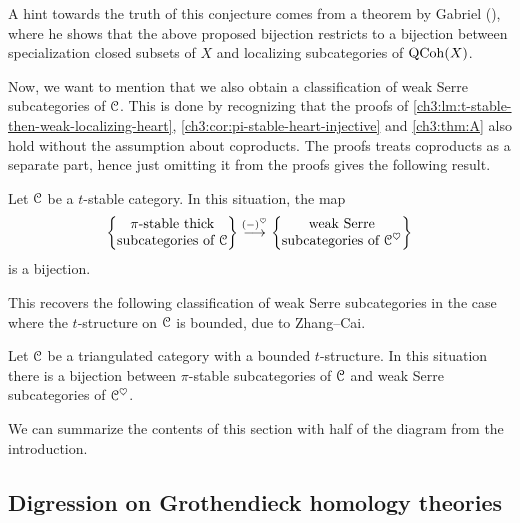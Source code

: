\begin{remark}
    A hint towards the truth of this conjecture comes from a theorem by Gabriel (\cite[VI.2.4(b)]{gabriel_1962}), where he shows that the above proposed bijection restricts to a bijection between specialization closed subsets of $X$ and localizing subcategories of $\operatorname{QCoh}(X)$. 
\end{remark}

Now, we want to mention that we also obtain a classification of weak Serre subcategories of $\EuScript{C}$. This is done by recognizing that the proofs of \cref{ch3:lm:t-stable-then-weak-localizing-heart}, \cref{ch3:cor:pi-stable-heart-injective} and \cref{ch3:thm:A} also hold without the assumption about coproducts. The proofs treats coproducts as a separate part, hence just omitting it from the proofs gives the following result. 

\begin{proposition}
    \label{ch3:prop:classification-weak-serre}
    Let $\EuScript{C}$ be a $t$-stable category. In this situation, the map 
    \[\left\{ \begin{matrix} \pi\text{-stable thick}\\ \text{subcategories of }\EuScript{C} \end{matrix} \right\}\overset{(-)^\heartsuit}{\longrightarrow} \left\{ \begin{matrix} \text{weak Serre}\\ \text{subcategories of }\EuScript{C}^\heartsuit \end{matrix} \right\}\] 
    is a bijection. 
\end{proposition}

This recovers the following classification of weak Serre subcategories in the case where the $t$-structure on $\EuScript{C}$ is bounded, due to Zhang--Cai.

\begin{corollary}
    \label{ch3:cor:classification-weak-serre-bounded}
    Let $\EuScript{C}$ be a triangulated category with a bounded $t$-structure. In this situation there is a bijection between $\pi$-stable subcategories of $\EuScript{C}$ and weak Serre subcategories of $\EuScript{C}^\heartsuit$.  
\end{corollary}

We can summarize the contents of this section with half of the diagram from the introduction. 

\begin{center}
\end{center}

\subsection*{Digression on Grothendieck homology theories}


